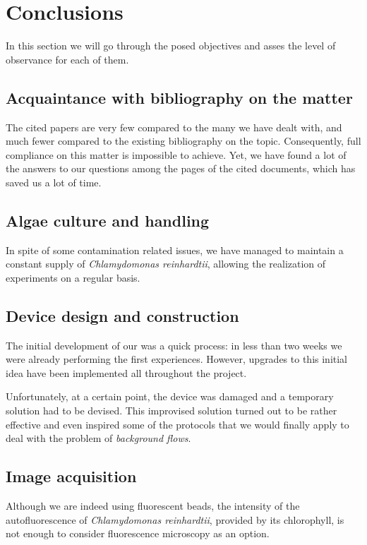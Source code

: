 \chapter{Conclusions}
\label{conclusions}

In this section we will go through the posed objectives and asses the level of observance for each of them.

\section{Acquaintance with bibliography on the matter}

The cited papers are very few compared to the many we have dealt with, and much fewer compared to the existing bibliography on the topic. Consequently, full compliance on this matter is impossible to achieve. Yet, we have found a lot of the answers to our questions among the pages of the cited documents, which has saved us a lot of time.

\section{Algae culture and handling}

In spite of some contamination related issues, we have managed to maintain a constant supply of \textit{Chlamydomonas reinhardtii}, allowing the realization of experiments on a regular basis. 

\section{Device design and construction}

The initial development of our was a quick process: in less than two weeks we were already performing the first experiences. However, upgrades to this initial idea have been implemented all throughout the project.

Unfortunately, at a certain point, the device was damaged and a temporary solution had to be devised. This improvised solution turned out to be rather effective and even inspired some of the protocols that we would finally apply to deal with the problem of \textit{background flows}.

\section{Image acquisition}

Although we are indeed using fluorescent beads, the intensity of the autofluorescence of \textit{Chlamydomonas reinhardtii}, provided by its chlorophyll, is not enough to consider fluorescence microscopy as an option.

